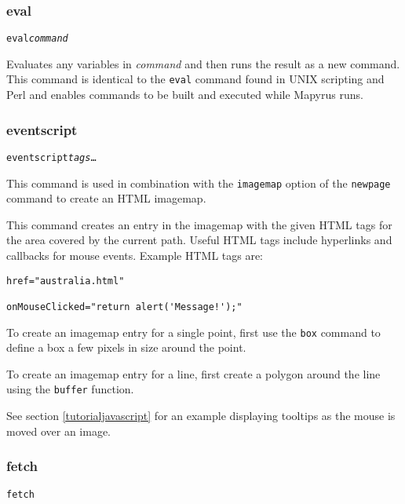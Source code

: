 \subsubsection{eval}

\begin{alltt}
eval \textit{command}
\end{alltt}

Evaluates any variables in \textit{command} and then
runs the result as a new command.
This command is identical to the \texttt{eval} command found in
UNIX scripting and Perl and
enables commands to be built and executed while Mapyrus runs.

\subsubsection{eventscript}

\begin{alltt}
eventscript \textit{tags} \ldots
\end{alltt}

This command is used in combination with the \texttt{imagemap}
option of the \texttt{newpage} command to create an HTML imagemap.

This command creates an entry in the imagemap with the given HTML tags
for the area covered by the current path.
Useful HTML tags include hyperlinks and callbacks for mouse events.
Example HTML tags are:

\begin{verbatim}
href="australia.html"

onMouseClicked="return alert('Message!');"
\end{verbatim}

To create an imagemap entry for a single point, first use the \texttt{box}
command to define a box a few pixels in size around the point.

To create an imagemap entry for a line, first create a polygon
around the line using the \texttt{buffer} function.

See section
\ref{tutorialjavascript}
for an example displaying tooltips as the mouse is moved over an image.

\subsubsection{fetch}

\begin{alltt}
fetch
\end{alltt}

